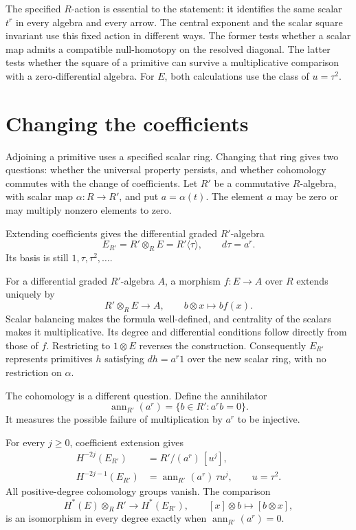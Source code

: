 The specified $R$-action is essential to the statement: it identifies
the same scalar $t^r$ in every algebra and every arrow.
The central exponent and the scalar square invariant use this fixed
action in different ways. The former tests whether a scalar map admits
a compatible null-homotopy on the resolved diagonal.
The latter tests whether the square of a primitive can survive a
multiplicative comparison with a zero-differential algebra.
For $E$, both calculations use the class of $u=\tau^2$.

\section{Changing the coefficients}
\label{sec:rel-coefficient-change}

Adjoining a primitive uses a specified scalar ring.
Changing that ring gives two questions: whether the universal property
persists, and whether cohomology commutes with the change of coefficients.
Let $R'$ be a commutative $R$-algebra, with scalar map
$\alpha:R\to R'$, and put $a=\alpha(t)$.
The element $a$ may be zero or may multiply nonzero elements to zero.

Extending coefficients gives the differential graded $R'$-algebra
\[
 E_{R'}=R'\otimes_R E=R'\langle\tau\rangle,
 \qquad d\tau=a^r.
\]
Its basis is still $1,\tau,\tau^2,\ldots$.

For a differential graded $R'$-algebra $A$, a morphism $f:E\to A$
over $R$ extends uniquely by
\[
 R'\otimes_R E\longrightarrow A,\qquad b\otimes x\longmapsto b f(x).
\]
Scalar balancing makes the formula well-defined, and centrality of the
scalars makes it multiplicative. Its degree and differential conditions
follow directly from those of $f$.
Restricting to $1\otimes E$ reverses the construction.
Consequently $E_{R'}$ represents primitives $h$ satisfying $dh=a^r1$
over the new scalar ring, with no restriction on $\alpha$.

The cohomology is a different question. Define the annihilator
\[
 \operatorname{ann}_{R'}(a^r)=\{b\in R':a^rb=0\}.
\]
It measures the possible failure of multiplication by $a^r$ to be
injective.

\begin{proposition}\label{prop:rel-specialization}
For every $j\geq0$, coefficient extension gives
\[
 \begin{split}
 H^{-2j}(E_{R'})&=R'/(a^r)\,[u^j],\\
 H^{-2j-1}(E_{R'})&=\operatorname{ann}_{R'}(a^r)\,\tau u^j,
 \qquad u=\tau^2.
 \end{split}
\]
All positive-degree cohomology groups vanish.
The comparison
\[
 H^*(E)\otimes_R R'\longrightarrow H^*(E_{R'}),
 \qquad [x]\otimes b\longmapsto[b\otimes x],
\]
is an isomorphism in every degree exactly when
$\operatorname{ann}_{R'}(a^r)=0$.
\end{proposition}

